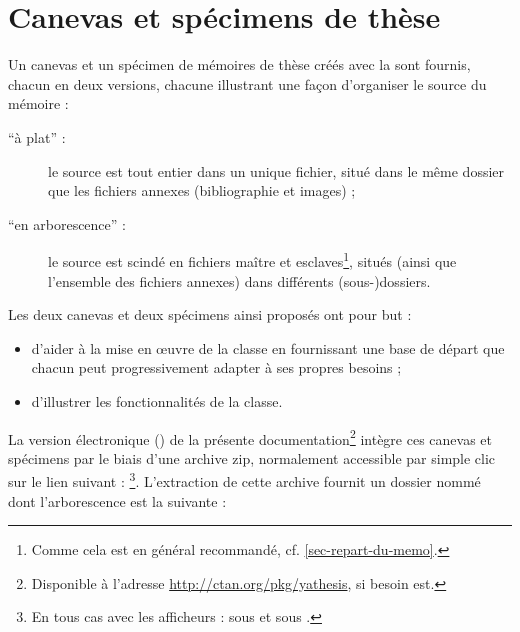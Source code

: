 \chapter{Canevas et spécimens de thèse}\label{cha-specimen-canevas}%
%
%

Un canevas et un spécimen de mémoires de thèse créés avec la \yatCl sont
fournis, chacun en deux versions, chacune illustrant une façon d'organiser le
source  du mémoire :
\begin{description}
\item[\enquote{à plat} :] le source est tout entier dans un unique fichier,
  situé dans le même dossier que les fichiers annexes (bibliographie et
  images) ;
\item[\enquote{en arborescence} :]%
  le source est scindé en fichiers maître et esclaves\footnote{Comme cela est en
    général recommandé, cf. \vref{sec-repart-du-memo}.}, situés (ainsi que
  l'ensemble des fichiers annexes) dans différents (sous-)dossiers.
\end{description}
Les deux canevas et deux spécimens ainsi proposés ont pour but :
\begin{itemize}
\item d'aider à la mise en œuvre de la classe en fournissant une base de départ
  que chacun peut progressivement adapter à ses propres
  besoins ;
\item d'illustrer les fonctionnalités de la classe.
\end{itemize}

La version électronique (\pdf{}) de la présente
documentation\footnote{Disponible à l'adresse
  \url{http://ctan.org/pkg/yathesis}, si besoin est.} intègre ces canevas et
spécimens par le biais d'une archive \gls{zip}, normalement accessible par
simple clic sur le lien suivant :
\footnote{En
  tous cas avec les afficheurs \pdf:{}  sous \linux et
  \href{http://www.sumatrapdfreader.org/free-pdf-reader-fr.html}{}
  sous \windows.}. L'extraction de cette archive fournit un dossier nommé
 dont l'arborescence est la suivante :

\setlength{\DTbaselineskip}{15pt}
\begin{tcolorbox}
\end{tcolorbox}


